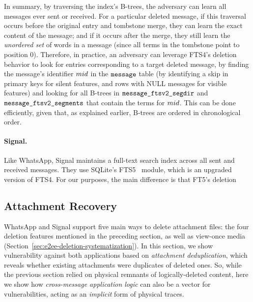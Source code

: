 In summary, by traversing the index's B-trees, the adversary can learn all messages ever sent or received. For a particular deleted message, if this traversal occurs before the original entry and tombstone merge, they can learn the exact content of the message; and if it occurs after the merge, they still learn the \emph{unordered set} of words in a message (since all terms in the tombstone point to position 0). Therefore, in practice, an adversary can leverage FTS4's deletion behavior to look for entries corresponding to a target deleted message, by finding the message's identifier $mid$ in the $\texttt{message}$ table (by identifying a skip in primary keys for silent features, and rows with NULL messages for visible features) and looking for all B-trees in $\texttt{message\_ftsv2\_segdir}$ and $\texttt{message\_ftsv2\_segments}$ that contain the terms for $mid$. This can be done efficiently, given that, as explained earlier, B-trees are ordered in chronological order.

\paragraph{Signal.}
Like WhatsApp, Signal maintains a full-text search index across all sent and received messages. They use SQLite's FTS5~\cite{sqlite-fts5} module, which is an upgraded version of FTS4. For our purposes, the main difference is that FT5's deletion


\subsection{Attachment Recovery}\label{subsec:attacks-attachment}
WhatsApp and Signal support five main ways to delete attachment files: the four deletion features mentioned in the preceding section, as well as view-once media (Section~\ref{sec:e2ee-deletion-systematization}). In this section, we show vulnerability against both applications based on \emph{attachment deduplication}, which reveals whether existing attachments were duplicates of deleted ones. So, while the previous section relied on physical remnants of logically-deleted content, here we show how \emph{cross-message application logic} can also be a vector for vulnerabilities, acting as an \emph{implicit} form of physical traces.





